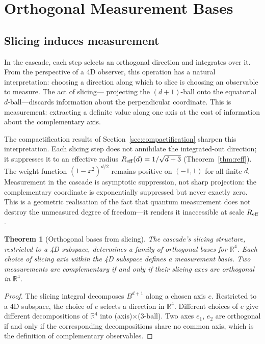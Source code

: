 \documentclass[12pt,a4paper]{article}
\newtheorem{theorem}{Theorem}[section]
\begin{document}
\section{Orthogonal Measurement Bases}\label{sec:orthogonal-measurement-bases}

\subsection{Slicing induces measurement}

In the cascade, each step selects an orthogonal direction and integrates over it. From the
perspective of a 4D observer, this operation has a natural interpretation: choosing a
direction along which to slice is choosing an observable to measure. The act of slicing---
projecting the $(d+1)$-ball onto the equatorial $d$-ball---discards information about the
perpendicular coordinate. This is measurement: extracting a definite value along one axis
at the cost of information about the complementary axis.

The compactification results of Section~\ref{sec:compactification} sharpen this
interpretation. Each slicing step does not annihilate the integrated-out direction; it
suppresses it to an effective radius $R_{\rm eff}(d)=1/\sqrt{d+3}$
(Theorem~\ref{thm:reff}). The weight function $(1-x^2)^{d/2}$ remains positive on $(-1,1)$
for all finite $d$. Measurement in the cascade is asymptotic suppression, not sharp
projection: the complementary coordinate is exponentially suppressed but never exactly zero.
This is a geometric realisation of the fact that quantum measurement does not destroy the
unmeasured degree of freedom---it renders it inaccessible at scale $R_{\rm eff}$.

\begin{theorem}[Orthogonal bases from slicing]\label{thm:bases}
The cascade's slicing structure, restricted to a 4D subspace, determines a family of
orthogonal bases for $\mathbb{R}^4$. Each choice of slicing axis within the 4D subspace
defines a measurement basis. Two measurements are complementary if and only if their slicing
axes are orthogonal in $\mathbb{R}^4$.
\end{theorem}
\begin{proof}
The slicing integral decomposes $B^{d+1}$ along a chosen axis $e$. Restricted to a 4D
subspace, the choice of $e$ selects a direction in $\mathbb{R}^4$. Different choices of $e$
give different decompositions of $\mathbb{R}^4$ into (axis)$\times$(3-ball). Two axes $e_1$,
$e_2$ are orthogonal if and only if the corresponding decompositions share no common axis,
which is the definition of complementary observables.
\end{proof}
\end{document}
